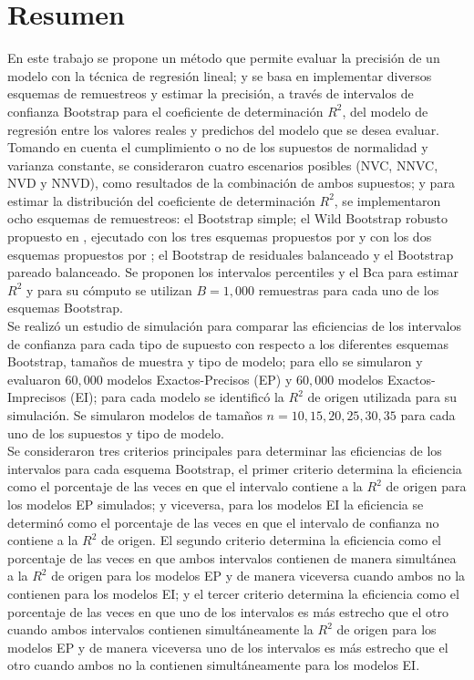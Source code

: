 \section*{Resumen}

En este trabajo se propone un método que permite evaluar la precisión de un modelo con la técnica de regresión lineal; y se basa en implementar diversos esquemas de remuestreos y estimar la precisión, a través de intervalos de confianza Bootstrap para el coeficiente de determinación $R^2$, del modelo de regresión entre los valores reales y predichos del modelo que se desea evaluar.\\

Tomando en cuenta el cumplimiento o no de los supuestos de normalidad y varianza constante, se consideraron cuatro escenarios posibles (NVC, NNVC, NVD y NNVD), como resultados de la combinación de ambos supuestos; y para estimar la distribución del coeficiente de determinación $R^2$, se implementaron ocho esquemas de remuestreos: el Bootstrap simple; el Wild Bootstrap robusto propuesto en \textcite{rana-2012}, ejecutado con los tres esquemas propuestos por \textcite{wu-1986} y con los dos esquemas propuestos por \textcite{liu-1988}; el Bootstrap de residuales balanceado y el Bootstrap pareado balanceado. Se proponen los intervalos percentiles y el Bca para estimar $R^2$ y para su cómputo se utilizan $B=1,000$ remuestras para cada uno de los esquemas Bootstrap.\\ 

Se realizó un estudio de simulación para comparar las eficiencias de los intervalos de confianza para cada tipo de supuesto con respecto a los diferentes esquemas Bootstrap, tamaños de muestra y tipo de modelo; para ello se simularon y evaluaron $60,000$ modelos Exactos-Precisos (EP) y $60,000$ modelos Exactos-Imprecisos (EI); para cada modelo se identificó la $R^2$ de origen utilizada para su simulación. Se simularon modelos de tamaños $n=10, 15, 20, 25, 30, 35$ para cada uno de los supuestos y tipo de modelo.\\

Se consideraron tres criterios principales para determinar las eficiencias de los intervalos para cada esquema Bootstrap, el primer criterio determina la eficiencia como el porcentaje de las veces en que el intervalo contiene a la $R^2$ de origen para los modelos EP simulados; y viceversa, para los modelos EI la eficiencia se determinó como el porcentaje de las veces en que el intervalo de confianza no contiene a la $R^2$ de origen. El segundo criterio determina la eficiencia como el porcentaje de las veces en que ambos intervalos contienen de manera simultánea a la $R^2$ de origen para los modelos EP y de manera viceversa cuando ambos no la contienen para los modelos EI; y el tercer criterio determina la eficiencia como el porcentaje de las veces en que uno de los intervalos es más estrecho que el otro cuando ambos intervalos contienen simultáneamente la $R^2$ de origen para los modelos EP y de manera viceversa uno de los intervalos es más estrecho que el otro cuando ambos no la contienen simultáneamente para los modelos EI.\\

